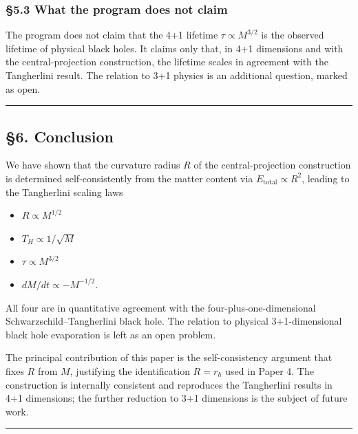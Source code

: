 \documentclass[a4paper,11pt]{article}
\theoremstyle{definition}
\providecommand{\tightlist}{\setlength{\itemsep}{0pt}\setlength{\parskip}{0pt}}
\begin{document}
\subsubsection{§5.3 What the program does not
claim}\label{what-the-program-does-not-claim}

The program does not claim that the 4+1 lifetime
\(\tau \propto M^{3/2}\) is the observed lifetime of physical black
holes. It claims only that, in 4+1 dimensions and with the
central-projection construction, the lifetime scales in agreement with
the Tangherlini result. The relation to 3+1 physics is an additional
question, marked as open.

\begin{center}\rule{0.5\linewidth}{0.5pt}\end{center}

\subsection{§6. Conclusion}\label{conclusion}

We have shown that the curvature radius \(R\) of the central-projection
construction is determined self-consistently from the matter content via
\(E_{\mathrm{total}} \propto R^2\), leading to the Tangherlini scaling
laws

\begin{itemize}
\tightlist
\item
  \(R \propto M^{1/2}\)
\item
  \(T_H \propto 1/\sqrt{M}\)
\item
  \(\tau \propto M^{3/2}\)
\item
  \(dM/dt \propto -M^{-1/2}\).
\end{itemize}

All four are in quantitative agreement with the
four-plus-one-dimensional Schwarzschild--Tangherlini black hole. The
relation to physical 3+1-dimensional black hole evaporation is left as
an open problem.

The principal contribution of this paper is the self-consistency
argument that fixes \(R\) from \(M\), justifying the identification
\(R = r_h\) used in Paper 4. The construction is internally consistent
and reproduces the Tangherlini results in 4+1 dimensions; the further
reduction to 3+1 dimensions is the subject of future work.

\begin{center}\rule{0.5\linewidth}{0.5pt}\end{center}
\end{document}
